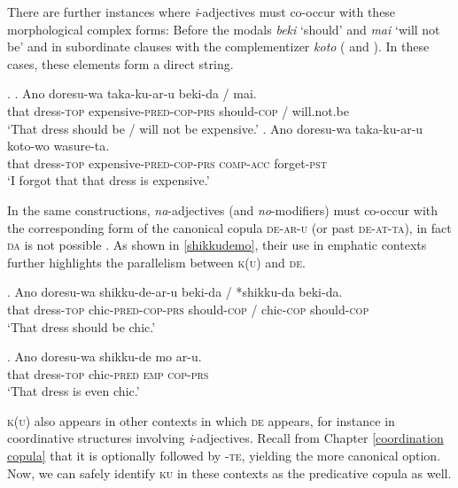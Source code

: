 \documentclass [output=book,colorlinks,citecolor=brown]{langscibook}
\begin{document}
There are further instances where \textit{i}-adjectives must co-occur with these morphological complex forms: Before the modals \textit{beki} `should’ and \textit{mai} `will not be’ and in subordinate clauses with the complementizer \textit{koto} (\citealt[199]{nishiyama:1999:adj} and \citealt[51]{miyama:2011:da}). In these cases, these elements form a direct string. %


\ex. \ag. Ano doresu-wa taka-ku-ar-u beki-da / mai.\\
that dress-\textsc{top} expensive-\textsc{pred-cop-prs} should-\textsc{cop} / will.not.be\\
`That dress should be / will not be expensive.'
\bg. Ano doresu-wa taka-ku-ar-u koto-wo wasure-ta.\\
that dress-\textsc{top} expensive-\textsc{pred-cop-prs} \textsc{comp}-\textsc{acc} forget-\textsc{pst}\\
`I forgot that that dress is expensive.'

In the same constructions, \textit{na}-adjectives (and \textit{no}-modifiers) must co-occur with the corresponding form of the canonical copula \textsc{de-ar-u}  (or past \textsc{de-at-ta}), in fact \textsc{da} is not possible \citep[186]{nishiyama:1999:adj}. As shown in \ref{shikkudemo}, their use in emphatic contexts further highlights the parallelism between \textsc{k(u)} and \textsc{de}. %

\exg. Ano doresu-wa shikku-de-ar-u beki-da / *shikku-da beki-da.\\
that dress-\textsc{top} chic-\textsc{pred-cop-prs} should-\textsc{cop} / chic-\textsc{cop} should-\textsc{cop}\\
`That dress should be chic.'

\exg. Ano doresu-wa shikku-de mo ar-u.\\
that dress-\textsc{top} chic-\textsc{pred} \textsc{emp} \textsc{cop-prs}\\
`That dress is even chic.' \label{shikkudemo}

\textsc{k(u)} also appears in other contexts in which \textsc{de} appears, for instance in coordinative structures involving \textit{i}-adjectives. Recall from Chapter \ref{coordination copula} that it is optionally followed by -\textsc{te}, yielding the more canonical option. Now, we can safely identify \textsc{ku} in these contexts as the predicative copula as well.%
\end{document}
